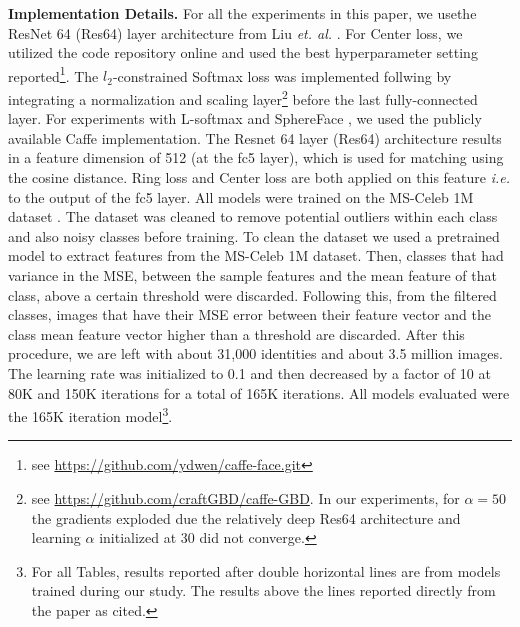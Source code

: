 \documentclass[10pt,twocolumn,letterpaper]{article}
\begin{document}
\textbf{Implementation Details.}
For all the experiments in this paper, we usethe ResNet 64 (Res64) layer architecture from Liu \emph{et. al.} \cite{liu2017sphereface}. For Center loss, we utilized the code repository online and used the best hyperparameter setting reported\footnote{see \url{https://github.com/ydwen/caffe-face.git}}. The $l_2$-constrained Softmax loss was implemented follwing \cite{ranjan2017l2}  by integrating a normalization and scaling layer\footnote{see \url{https://github.com/craftGBD/caffe-GBD}. In our experiments, for $\alpha=50$ the gradients exploded due the relatively deep Res64 architecture and learning $\alpha$ initialized at 30 did not converge.} before the last fully-connected layer. For experiments with L-softmax \cite{liu2016large} and SphereFace \cite{liu2017sphereface}, we used the publicly available Caffe implementation. The Resnet 64 layer (Res64) architecture results in a feature dimension of 512 (at the fc5 layer), which is used for  matching using the cosine distance. Ring loss and Center loss are both applied on this feature \emph{i.e.} to the output of the fc5 layer.  All models were trained on the MS-Celeb 1M dataset \cite{guo2016ms}. The dataset was cleaned to remove potential outliers within each class and also noisy classes before training. To clean the dataset we used a pretrained model to  extract features from the MS-Celeb 1M dataset. Then, classes that had variance in the MSE, between the sample features and the mean feature of that class, above a certain threshold were discarded. Following this, from the filtered classes, images that have their MSE error between their feature vector and the class mean feature vector higher than a threshold are discarded. After this procedure, we are left with about 31,000 identities and about 3.5 million images. The learning rate was initialized to 0.1 and then decreased by a factor of 10 at 80K and 150K iterations for a total of 165K iterations. All models evaluated were the 165K iteration model\footnote{For all Tables, results reported after double horizontal lines are from models trained during our study. The results above the lines reported directly from the paper as cited.}.



 

\end{document}
